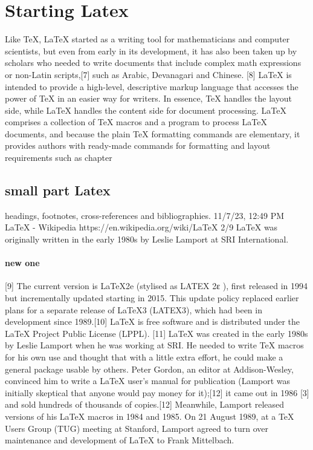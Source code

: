 \documentclass[]{report}
\begin{document}
	\section{Starting Latex}Like TeX, LaTeX started as a writing tool for mathematicians and computer scientists, but even from
	early in its development, it has also been taken up by scholars who needed to write documents that
	include complex math expressions or non-Latin scripts,[7]
	such as Arabic, Devanagari and Chinese.
	[8]
	LaTeX is intended to provide a high-level, descriptive markup language that accesses the power of
	TeX in an easier way for writers. In essence, TeX handles the layout side, while LaTeX handles the
	content side for document processing. LaTeX comprises a collection of TeX macros and a program to
	process LaTeX documents, and because the plain TeX formatting commands are elementary, it
	provides authors with ready-made commands for formatting and layout requirements such as chapter
	
	\subsection{small part Latex}
	headings, footnotes, cross-references and bibliographies.
	11/7/23, 12:49 PM LaTeX - Wikipedia
	https://en.wikipedia.org/wiki/LaTeX 2/9
	LaTeX was originally written in the early 1980s by Leslie Lamport at SRI International. \paragraph{new one}
	[9] The current
	version is LaTeX2e (stylised as LATEX 2ε
	), first released in 1994 but incrementally updated starting in
	2015. This update policy replaced earlier plans for a separate release of LaTeX3 (LATEX3), which had
	been in development since 1989.[10] LaTeX is free software and is distributed under the LaTeX Project
	Public License (LPPL).
	[11]
	LaTeX was created in the early 1980s by Leslie Lamport when he was working at SRI. He needed to
	write TeX macros for his own use and thought that with a little extra effort, he could make a general
	package usable by others. Peter Gordon, an editor at Addison-Wesley, convinced him to write a LaTeX
	user's manual for publication (Lamport was initially skeptical that anyone would pay money for it);[12]
	it came out in 1986
	[3] and sold hundreds of thousands of copies.[12] Meanwhile, Lamport released
	versions of his LaTeX macros in 1984 and 1985. On 21 August 1989, at a TeX Users Group (TUG)
	meeting at Stanford, Lamport agreed to turn over maintenance and development of LaTeX to Frank
	Mittelbach. 
	
\end{document}
